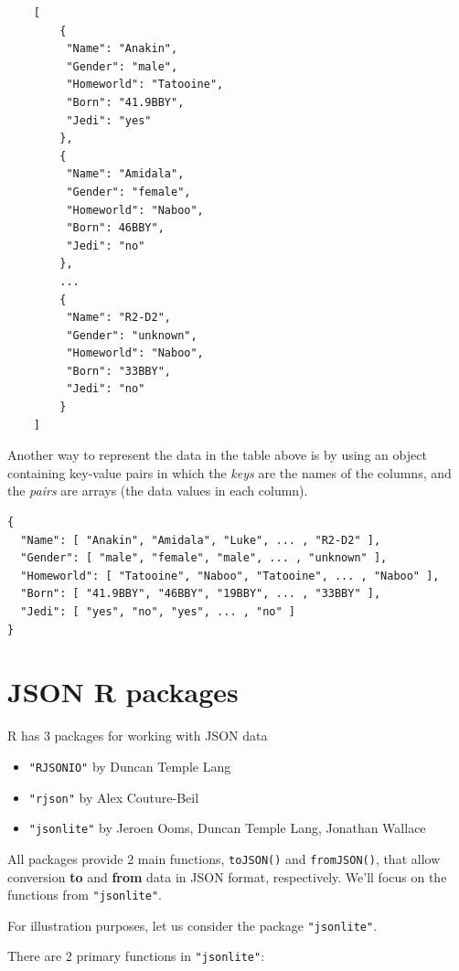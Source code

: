 \documentclass[
]{book}
\begin{document}
\begin{verbatim}
    [
        {
         "Name": "Anakin",
         "Gender": "male", 
         "Homeworld": "Tatooine",
         "Born": "41.9BBY",
         "Jedi": "yes"
        },
        {
         "Name": "Amidala",
         "Gender": "female", 
         "Homeworld": "Naboo",
         "Born": 46BBY",
         "Jedi": "no"
        },
        ...
        {
         "Name": "R2-D2",
         "Gender": "unknown",
         "Homeworld": "Naboo",
         "Born": "33BBY",
         "Jedi": "no"
        }
    ]
\end{verbatim}

Another way to represent the data in the table above is by using an object
containing key-value pairs in which the \emph{keys} are the names of the columns,
and the \emph{pairs} are arrays (the data values in each column).

\begin{verbatim}
{
  "Name": [ "Anakin", "Amidala", "Luke", ... , "R2-D2" ],
  "Gender": [ "male", "female", "male", ... , "unknown" ],
  "Homeworld": [ "Tatooine", "Naboo", "Tatooine", ... , "Naboo" ],
  "Born": [ "41.9BBY", "46BBY", "19BBY", ... , "33BBY" ],
  "Jedi": [ "yes", "no", "yes", ... , "no" ] 
}
\end{verbatim}

\hypertarget{jsonlite}{%
\chapter{JSON R packages}\label{jsonlite}}

R has 3 packages for working with JSON data

\begin{itemize}
\item
  \texttt{"RJSONIO"} by Duncan Temple Lang
\item
  \texttt{"rjson"} by Alex Couture-Beil
\item
  \texttt{"jsonlite"} by Jeroen Ooms, Duncan Temple Lang, Jonathan Wallace
\end{itemize}

All packages provide 2 main functions, \texttt{toJSON()} and \texttt{fromJSON()}, that allow
conversion \textbf{to} and \textbf{from} data in JSON format, respectively.
We'll focus on the functions from \texttt{"jsonlite"}.

For illustration purposes, let us consider the package \texttt{"jsonlite"}.

There are 2 primary functions in \texttt{"jsonlite"}:
\end{document}

